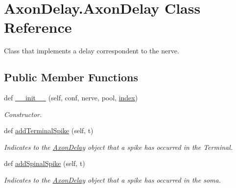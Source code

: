 \hypertarget{class_axon_delay_1_1_axon_delay}{}\section{Axon\+Delay.\+Axon\+Delay Class Reference}
\label{class_axon_delay_1_1_axon_delay}


Class that implements a delay correspondent to the nerve.  


\subsection*{Public Member Functions}
\begin{DoxyCompactItemize}
\item 
def \hyperlink{class_axon_delay_1_1_axon_delay_a6f4173dddb3ecf46988a32cbbd118ba8}{\+\_\+\+\_\+init\+\_\+\+\_\+} (self, conf, nerve, pool, \hyperlink{class_axon_delay_1_1_axon_delay_a5dbb9b5002d4b54bf347f48337bdb1c6}{index})
\begin{DoxyCompactList}\small\item\em Constructor. \end{DoxyCompactList}\item 
def \hyperlink{class_axon_delay_1_1_axon_delay_a0a75705e6de98e89462381245bb4cb51}{add\+Terminal\+Spike} (self, t)
\begin{DoxyCompactList}\small\item\em Indicates to the \hyperlink{class_axon_delay_1_1_axon_delay}{Axon\+Delay} object that a spike has occurred in the Terminal. \end{DoxyCompactList}\item 
def \hyperlink{class_axon_delay_1_1_axon_delay_a3fe989d5e27974a6c0ad9e92f3752685}{add\+Spinal\+Spike} (self, t)
\begin{DoxyCompactList}\small\item\em Indicates to the \hyperlink{class_axon_delay_1_1_axon_delay}{Axon\+Delay} object that a spike has occurred in the soma. \end{DoxyCompactList}\end{DoxyCompactItemize}
